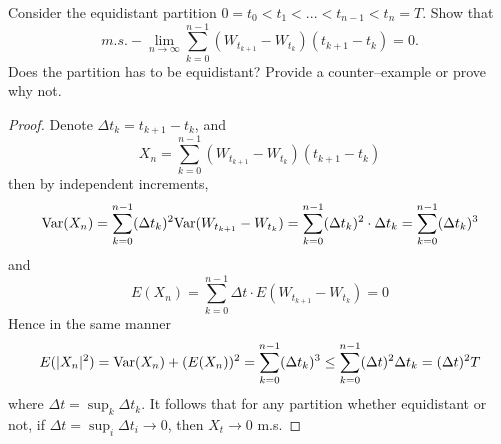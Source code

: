     \problem
    \begin{question}
        Consider the equidistant partition $0=t_0<t_1<...<t_{n-1}<t_n=T$.  Show that
        \[m.s.-\lim_{n\rightarrow \infty}\sum_{k=0}^{n-1}(W_{t_{k+1}}-W_{t_k})(t_{k+1}-t_k)=0.\]
        Does the partition has to be equidistant? Provide a counter--example or prove why not.
    \end{question}
    \begin{proof}
        Denote $\Delta t_k=t_{k+1}-t_k$, and
        \[X_n=\sum_{k=0}^{n-1}(W_{t_{k+1}}-W_{t_k})(t_{k+1}-t_k)\]
        then by independent increments,
        \[\mathrm{Var}(X_n)
        =\sum_{k=0}^{n-1}(\Delta t_k)^2\mathrm{Var}(W_{t_{k+1}}-W_{t_k})
        =\sum_{k=0}^{n-1}(\Delta t_k)^2\cdot\Delta t_k
        =\sum_{k=0}^{n-1}(\Delta t_k)^3\]
        and 
        \[E(X_n)=\sum_{k=0}^{n-1}\Delta t\cdot E(W_{t_{k+1}}-W_{t_k})
        =0\]
        Hence in the same manner
        \[E(|X_n|^2)=\mathrm{Var}(X_n)+(E(X_n))^2=\sum_{k=0}^{n-1}(\Delta t_k)^3
        \leq\sum_{k=0}^{n-1}(\Delta t)^2\Delta t_k
        =(\Delta t)^2 T\]
        where $\Delta t=\sup_{k}\Delta t_k$.
        It follows that
        for any partition whether equidistant or not,
        if $\Delta t=\sup_i\Delta t_i\to 0$,
        then $X_t\to 0$ m.s.
    \end{proof}

